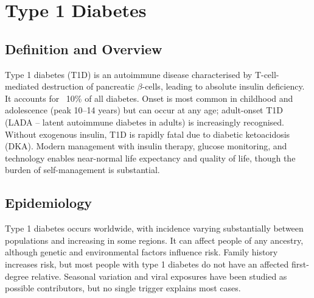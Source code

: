\chapter{Type 1 Diabetes}

\section*{Definition and Overview}
Type 1 diabetes (T1D) is an autoimmune disease characterised by T-cell-mediated destruction of pancreatic $\beta$-cells, leading to absolute insulin deficiency. It accounts for ~10\% of all diabetes. Onset is most common in childhood and adolescence (peak 10--14 years) but can occur at any age; adult-onset T1D (LADA -- latent autoimmune diabetes in adults) is increasingly recognised. Without exogenous insulin, T1D is rapidly fatal due to diabetic ketoacidosis (DKA). Modern management with insulin therapy, glucose monitoring, and technology enables near-normal life expectancy and quality of life, though the burden of self-management is substantial.

\section*{Epidemiology}
Type 1 diabetes occurs worldwide, with incidence varying substantially between populations and increasing in some regions. It can affect people of any ancestry, although genetic and environmental factors influence risk. Family history increases risk, but most people with type 1 diabetes do not have an affected first-degree relative. Seasonal variation and viral exposures have been studied as possible contributors, but no single trigger explains most cases.

